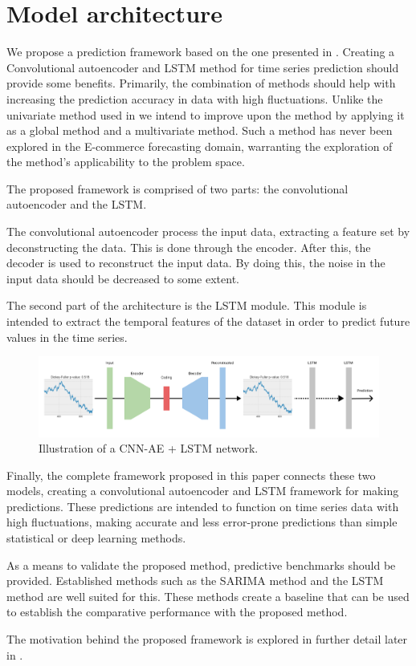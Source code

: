 \section{Model architecture}
\label{section:Architecture:Model}

We propose a prediction framework based on the one presented in \cite{Zhao2019}.
Creating a Convolutional autoencoder and LSTM method for time series prediction should provide some benefits.
Primarily, the combination of methods should help with increasing the prediction accuracy in data with high fluctuations.
Unlike the univariate method used in \cite{Zhao2019} we intend to improve upon the method by applying it as a global method and a multivariate method.
Such a method has never been explored in the E-commerce forecasting domain, warranting the exploration of the method's applicability to the problem space.

The proposed framework is comprised of two parts: the convolutional autoencoder and the LSTM.

The convolutional autoencoder process the input data, extracting a feature set by deconstructing the data.
This is done through the encoder. After this, the decoder is used to reconstruct the input data.
By doing this, the noise in the input data should be decreased to some extent.

The second part of the architecture is the LSTM module.
This module is intended to extract the temporal features of the dataset
in order to predict future values in the time series.

\begin{figure}[h!]
    \centering
    \includegraphics[width=\textwidth]{./sections/Architecture/figures/CNN-AE + LSTM.png}
    \hfill
    \caption{Illustration of a CNN-AE + LSTM network.}
    \label{fig:stacked_autoencoder_arch}
\end{figure}

Finally, the complete framework proposed in this paper connects these two models,
creating a convolutional autoencoder and LSTM framework for making predictions.
These predictions are intended to function on time series data with high fluctuations,
making accurate and less error-prone predictions than simple statistical or deep learning methods.


As a means to validate the proposed method, predictive benchmarks should be provided.
Established methods such as the SARIMA method and the LSTM method are well suited for this.
These methods create a baseline that can be used to establish the comparative performance with the proposed method.

The motivation behind the proposed framework is explored in further detail later in .

